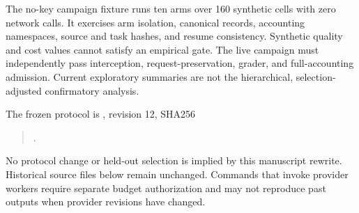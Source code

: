 The no-key campaign fixture runs ten arms over 160 synthetic cells with zero network
calls. It exercises arm isolation, canonical records, accounting namespaces, source
and task hashes, and resume consistency. Synthetic quality and cost values cannot
satisfy an empirical gate. The live campaign must independently pass interception,
request-preservation, grader, and full-accounting admission. Current exploratory
summaries are not the hierarchical, selection-adjusted confirmatory analysis.

The frozen protocol is , revision
12, SHA256
\begin{quote}\small
{}.
\end{quote}
No protocol change or held-out selection is implied by this manuscript rewrite.
Historical source files below remain unchanged. Commands that invoke provider
workers require separate budget authorization and may not reproduce past outputs
when provider revisions have changed.

